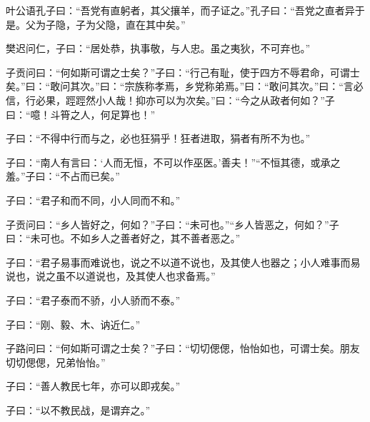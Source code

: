 \documentclass[12pt,a4paper]{ctexbook}
\begin{document}
叶公语孔子曰：“吾党有直躬者，其父攘羊，而子证之。”孔子曰：“吾党之直者异于是。父为子隐，子为父隐，直在其中矣。”\par
樊迟问仁，子曰：“居处恭，执事敬，与人忠。虽之夷狄，不可弃也。”\par
子贡问曰：“何如斯可谓之士矣？”子曰：“行己有耻，使于四方不辱君命，可谓士矣。”曰：“敢问其次。”曰：“宗族称孝焉，乡党称弟焉。”曰：“敢问其次。”曰：“言必信，行必果，踁踁然小人哉！抑亦可以为次矣。”曰：“今之从政者何如？”子曰：“噫！斗筲之人，何足算也！”\par
子曰：“不得中行而与之，必也狂狷乎！狂者进取，狷者有所不为也。”\par
子曰：“南人有言曰：‘人而无恒，不可以作巫医。’善夫！”“不恒其德，或承之羞。”子曰：“不占而已矣。”\par
子曰：“君子和而不同，小人同而不和。”\par
子贡问曰：“乡人皆好之，何如？”子曰：“未可也。”“乡人皆恶之，何如？”子曰：“未可也。不如乡人之善者好之，其不善者恶之。”\par
子曰：“君子易事而难说也，说之不以道不说也，及其使人也器之；小人难事而易说也，说之虽不以道说也，及其使人也求备焉。”\par
子曰：“君子泰而不骄，小人骄而不泰。”\par
子曰：“刚、毅、木、讷近仁。”\par
子路问曰：“何如斯可谓之士矣？”子曰：“切切偲偲，怡怡如也，可谓士矣。朋友切切偲偲，兄弟怡怡。”\par
子曰：“善人教民七年，亦可以即戎矣。”\par
子曰：“以不教民战，是谓弃之。”\par
\end{document}
